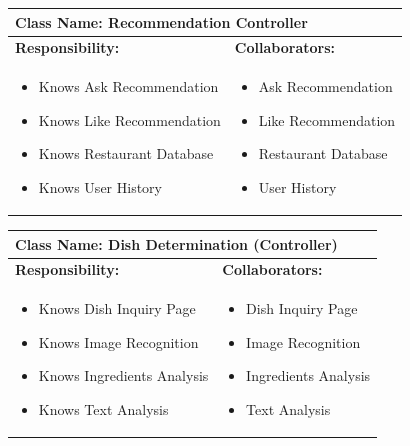 \documentclass[]{article}
\begin{document}
\begin{table}[H]
	\centering
	\begin{tabular}{|p{7cm}|p{7cm}|}
	\hline 
	 \multicolumn{2}{|l|}{\textbf{Class Name:} Recommendation Controller }\\
	\hline
	\textbf{Responsibility:} & \textbf{Collaborators:} \\
	\hline
	\raggedright
	\begin{itemize}
		\item Knows Ask Recommendation
		\item Knows Like Recommendation
		\item Knows Restaurant Database
		\item Knows User History
	\end{itemize}
	\vspace{1in} & 
	\begin{itemize}
		\item Ask Recommendation
		\item Like Recommendation
		\item Restaurant Database
		\item User History
	\end{itemize} \\
	\hline
	\end{tabular}
\end{table}

\begin{table}[H]
	\centering
	\begin{tabular}{|p{7cm}|p{7cm}|}
	\hline 
	 \multicolumn{2}{|l|}{\textbf{Class Name:} Dish Determination (Controller) }\\
	\hline
	\textbf{Responsibility:} & \textbf{Collaborators:} \\
	\hline
	\raggedright
	\begin{itemize}
		\item Knows Dish Inquiry Page
		\item Knows Image Recognition
		\item Knows Ingredients Analysis
		\item Knows Text Analysis
	\end{itemize}
	\vspace{1in} & 
	\begin{itemize}
		\item Dish Inquiry Page
		\item Image Recognition
		\item Ingredients Analysis
		\item Text Analysis
	\end{itemize} \\
	\hline
	\end{tabular}
\end{table}
\end{document}
